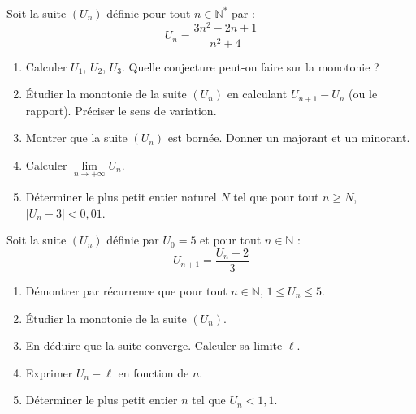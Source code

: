 \documentclass[11pt]{article}
\begin{document}
\begin{exercice}
\label{exo:proba1}
Soit la suite $(U_n)$ définie pour tout $n \in \mathbb{N}^*$ par :
\[ U_n = \frac{3n^2 - 2n + 1}{n^2 + 4} \]
\begin{enumerate}
    \item Calculer $U_1$, $U_2$, $U_3$. Quelle conjecture peut-on faire sur la monotonie ?
    \item Étudier la monotonie de la suite $(U_n)$ en calculant $U_{n+1} - U_n$ (ou le rapport). Préciser le sens de variation.
    \item Montrer que la suite $(U_n)$ est bornée. Donner un majorant et un minorant.
    \item Calculer $\lim\limits_{n\to +\infty} U_n$.
    \item Déterminer le plus petit entier naturel $N$ tel que pour tout $n \ge N$, $|U_n - 3| < 0,01$.
\end{enumerate}
\end{exercice}

\begin{exercice}
\label{exo:proba2}
Soit la suite $(U_n)$ définie par $U_0 = 5$ et pour tout $n \in \mathbb{N}$ :
\[ U_{n+1} = \frac{U_n + 2}{3} \]
\begin{enumerate}
    \item Démontrer par récurrence que pour tout $n \in \mathbb{N}$, $1 \le U_n \le 5$.
    \item Étudier la monotonie de la suite $(U_n)$.
    \item En déduire que la suite converge. Calculer sa limite $\ell$.
    \item Exprimer $U_n - \ell$ en fonction de $n$.
    \item Déterminer le plus petit entier $n$ tel que $U_n < 1,1$.
\end{enumerate}
\end{exercice}
\end{document}
